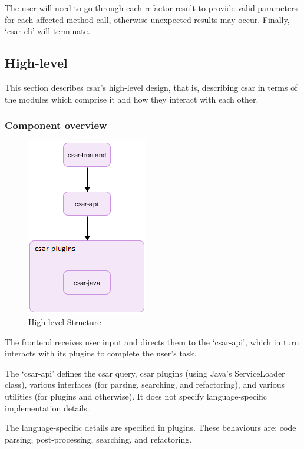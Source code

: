 \documentclass[12pt, letterpaper]{article}
\begin{document}
The user will need to go through each refactor result to provide valid parameters for each affected method call, otherwise unexpected results may occur.
Finally, `csar-cli' will terminate.

\subsection{High-level}
This section describes csar's high-level design, that is, describing csar in terms of the modules which comprise it and how they interact with each other.

\subsubsection{Component overview}
\begin{figure}[!hb]
  \centering
  \caption{High-level Structure}
  \includegraphics{figure-1}
\end{figure}

The frontend receives user input and directs them to the `csar-api', which in turn interacts with its plugins to complete the user's task.

The `csar-api' defines the csar query, csar plugins (using Java's ServiceLoader class), various interfaces (for parsing, searching, and refactoring), and various utilities (for plugins and otherwise).
It does not specify language-specific implementation details.

The language-specific details are specified in plugins.
These behaviours are: code parsing, post-processing, searching, and refactoring.
\end{document}
